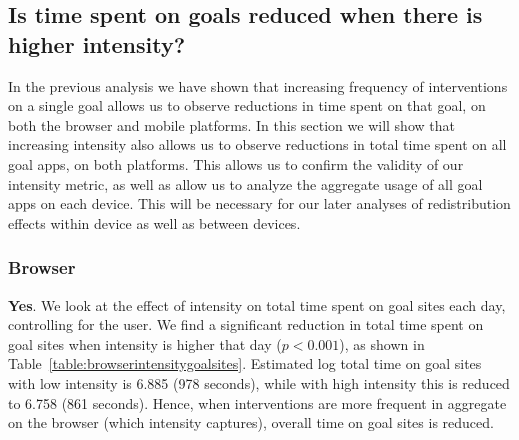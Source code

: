 \subsection{Is time spent on goals reduced when there is higher intensity?}

In the previous analysis we have shown that increasing frequency of interventions on a single goal allows us to observe reductions in time spent on that goal, on both the browser and mobile platforms. In this section we will show that increasing intensity also allows us to observe reductions in total time spent on all goal apps, on both platforms. This allows us to confirm the validity of our intensity metric, as well as allow us to analyze the aggregate usage of all goal apps on each device. This will be necessary for our later analyses of redistribution effects within device as well as between devices.


\subsubsection{Browser}

\textbf{Yes}. We look at the effect of intensity on total time spent on goal sites each day, controlling for the user. We find a significant reduction in total time spent on goal sites when intensity is higher that day ($p < 0.001$), as shown in Table~\ref{table:browserintensitygoalsites}. Estimated log total time on goal sites with low intensity is 6.885 (978 seconds), while with high intensity this is reduced to 6.758 (861 seconds). Hence, when interventions are more frequent in aggregate on the browser (which intensity captures), overall time on goal sites is reduced. %


